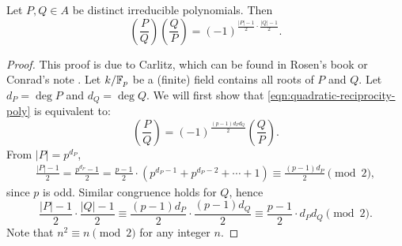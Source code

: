 \begin{theorem}
    \label{thm:quadratic-reciprocity-poly}
    Let $P, Q \in A$ be distinct irreducible polynomials.
    Then
    \begin{equation}
        \left(\frac{P}{Q}\right) \left(\frac{Q}{P}\right) = (-1)^{\frac{|P| - 1}{2} \cdot \frac{|Q| - 1}{2}}.
        \label{eqn:quadratic-reciprocity-poly}
    \end{equation}
\end{theorem}
\begin{proof}
    This proof is due to Carlitz, which can be found in Rosen's book \cite[p. 25, Theorem 3.3]{rosen2013number} or Conrad's note \cite[Section 3]{conrad_rec_odd}.
    Let $k / \mathbb{F}_p$ be a (finite) field contains all roots of $P$ and $Q$.
    Let $d_P = \deg P$ and $d_Q = \deg Q$.
    We will first show that \eqref{eqn:quadratic-reciprocity-poly} is equivalent to:
    \begin{equation}
        \left(\frac{P}{Q}\right) = (-1)^{\frac{(p-1) d_P d_Q}{2}} \left(\frac{Q}{P}\right).
        \label{eqn:quadratic-reciprocity-poly-cor}
    \end{equation} 
    From $|P| = p^{d_P}$,
    \begin{align*}
        \frac{|P| - 1}{2} = \frac{p^{d_P} - 1}{2} = \frac{p-1}{2} \cdot (p^{d_P-1} + p^{d_P-2} + \cdots + 1) \equiv \frac{(p-1) d_P}{2} \pmod{2},
    \end{align*}
    since $p$ is odd.
    Similar congruence holds for $Q$, hence
    \[
        \frac{|P| - 1}{2} \cdot \frac{|Q| - 1}{2} \equiv \frac{(p-1) d_P}{2} \cdot \frac{(p-1) d_Q}{2} \equiv \frac{p-1}{2} \cdot d_P d_Q \pmod{2}.
    \]
    Note that $n^2 \equiv n \pmod{2}$ for any integer $n$.
    

\end{proof}
